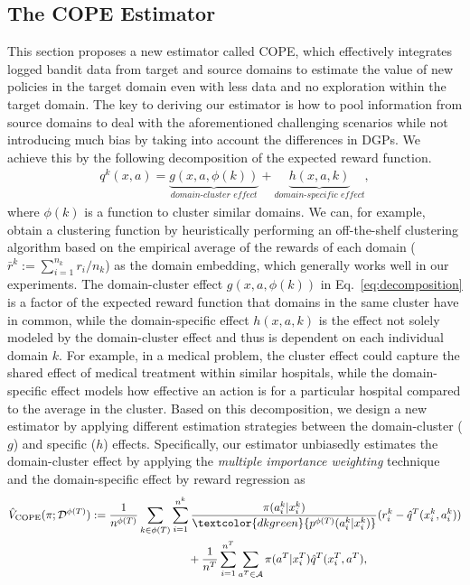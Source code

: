 \documentclass{article} %
\theoremstyle{definition}
\begin{document}
\subsection{The COPE Estimator}
This section proposes a new estimator called COPE, which effectively integrates logged bandit data from target and source domains to estimate the value of new policies in the target domain even with less data and no exploration within the target domain. The key to deriving our estimator is how to pool information from source domains to deal with the aforementioned challenging scenarios while not introducing much bias by taking into account the differences in DGPs. We achieve this by the following decomposition of the expected reward function.
\begin{align}
    q^k(x,a) = \underbrace{g(x,a,\phi(k))}_{\textit{domain-cluster effect}} + \underbrace{h(x,a,k)}_{\textit{domain-specific effect}}, \label{eq:decomposition}
\end{align}
where $\phi(k)$ is a function to cluster similar domains. 
We can, for example, obtain a clustering function by heuristically performing an off-the-shelf clustering algorithm based on the empirical average of the rewards of each domain ($\bar{r}^k := \sum_{i=1}^{n_k} r_i/n_{k}$) as the domain embedding, which generally works well in our experiments. 
The domain-cluster effect $g(x,a,\phi(k))$ in Eq.~\eqref{eq:decomposition} is a factor of the expected reward function that domains in the same cluster have in common, while the domain-specific effect $h(x,a,k)$ is the effect not solely modeled by the domain-cluster effect and thus is dependent on each individual domain $k$. For example, in a medical problem, the cluster effect could capture the shared effect of medical treatment within similar hospitals, while the domain-specific effect models how effective an action is for a particular hospital compared to the average in the cluster. Based on this decomposition, we design a new estimator by applying different estimation strategies between the domain-cluster ($g$) and specific ($h$) effects. Specifically, our estimator unbiasedly estimates the domain-cluster effect by applying the \textit{multiple importance weighting} technique~\citep{owen2013monte,agarwal2017effective} and the domain-specific effect by reward regression as 
\begin{align}
    \hat{V}_{\rm{COPE}}(\pi;\calD^{\phi(T)}) &:=
    \frac{1}{n^{\phi(T)}}\sum_{k \in \phi(T)}\sum_{i=1}^{n^{k}}\frac{\pi(a_{i}^{k}|x_{i}^{k})}{\textcolor{dkgreen}{p^{\phi(T)}(a_{i}^{k}|x_{i}^{k})}}(r_{i}^{k}-\hat{q}^T(x_{i}^{k},a_{i}^{k})) \notag \\
    &\hspace{3cm} +\frac{1}{n^{T}}\sum_{i=1}^{n^{T}}\sum_{a^T \in \calA}\pi(a^T|x_{i}^{T})\hat{q}^T(x_{i}^{T},a^T),  \label{eq:COPE}
\end{align}
\end{document}

